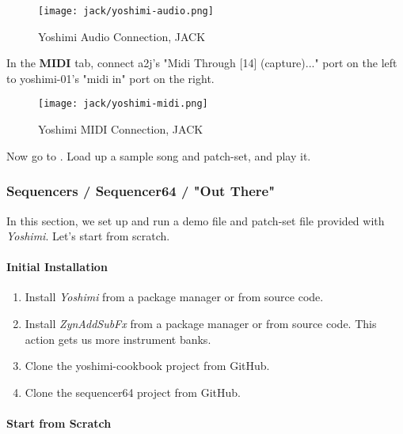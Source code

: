 \begin{figure}[H]
   \centering 
   \texttt{[image: jack/yoshimi-audio.png]}
   \caption{Yoshimi Audio Connection, JACK}
   \label{fig:cookbook_yoshimi_audio_connection}
\end{figure}

   In the \textbf{MIDI} tab, connect a2j's "Midi Through [14] (capture)..."
   port on the left to yoshimi-01's "midi in" port on the right.

\begin{figure}[H]
   \centering 
   \texttt{[image: jack/yoshimi-midi.png]}
   \caption{Yoshimi MIDI Connection, JACK}
   \label{fig:cookbook_yoshimi_midi_connection}
\end{figure}

   Now go to .
   Load up a sample song and patch-set, and play it.

\subsubsection{Sequencers / Sequencer64 / "Out There"}
\label{subsubsec:sequencers_seq64_out_there}

   In this section, we set up and run a demo file and patch-set file
   provided with \textsl{Yoshimi}.  Let's start from scratch.

\paragraph{Initial Installation}
\label{paragraph:yoshimi_init_install}

   \begin{enumerate}
      \item Install \textsl{Yoshimi} from a package manager or from source code.
      \item Install \textsl{ZynAddSubFx} from a package manager or from source
         code.  This action gets us more instrument banks.
      \item Clone the yoshimi-cookbook \cite{yoshimicookbook}
         project from GitHub.
      \item Clone the sequencer64 \cite{sequencer64} project from GitHub.
   \end{enumerate}

\paragraph{Start from Scratch}
\label{paragraph:yoshimi_start_from_scratch}

